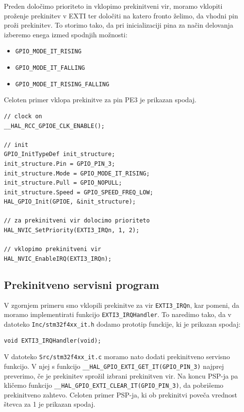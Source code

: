 \documentclass[12pt,letterpaper]{article}
\begin{document}
Preden določimo prioriteto in vklopimo prekinitveni vir, moramo vklopiti proženje prekinitev v EXTI ter določiti na katero fronto želimo, da vhodni pin proži prekinitev. To storimo tako, da pri inicializaciji pina za način delovanja izberemo enega izmed spodnjih možnosti:

\begin{itemize}
    \item \texttt{GPIO\_MODE\_IT\_RISING}
    \item \texttt{GPIO\_MODE\_IT\_FALLING}
    \item \texttt{GPIO\_MODE\_IT\_RISING\_FALLING}
\end{itemize}

Celoten primer vklopa prekinitve za pin PE3 je prikazan spodaj.

\begin{center}
\begin{lstlisting}[style=CStyle]
// clock on
__HAL_RCC_GPIOE_CLK_ENABLE();

// init
GPIO_InitTypeDef init_structure;
init_structure.Pin = GPIO_PIN_3;
init_structure.Mode = GPIO_MODE_IT_RISING;
init_structure.Pull = GPIO_NOPULL;
init_structure.Speed = GPIO_SPEED_FREQ_LOW;
HAL_GPIO_Init(GPIOE, &init_structure);

// za prekinitveni vir dolocimo prioriteto
HAL_NVIC_SetPriority(EXTI3_IRQn, 1, 2);

// vklopimo prekinitveni vir
HAL_NVIC_EnableIRQ(EXTI3_IRQn); 
\end{lstlisting}
\end{center}


\subsection*{Prekinitveno servisni program}

V zgornjem primeru smo vklopili prekinitve za vir \texttt{EXTI3\_IRQn}, kar pomeni, da moramo implementirati funkcijo \texttt{EXTI3\_IRQHandler}. To naredimo tako, da v datoteko \texttt{Inc/stm32f4xx\_it.h} dodamo prototip funckije, ki je prikazan spodaj:

\begin{center}
\begin{lstlisting}[style=CStyle]
void EXTI3_IRQHandler(void);
\end{lstlisting}
\end{center}

V datoteko \texttt{Src/stm32f4xx\_it.c} moramo nato dodati prekinitveno servisno funkcijo. V njej s funkcijo \texttt{\_\_HAL\_GPIO\_EXTI\_GET\_IT(GPIO\_PIN\_3)} najprej preverimo, če je prekinitev sprožil izbrani prekinitven vir. Na koncu PSP-ja pa kličemo funkcijo \texttt{\_\_HAL\_GPIO\_EXTI\_CLEAR\_IT(GPIO\_PIN\_3)}, da pobrišemo prekinitveno zahtevo. Celoten primer PSP-ja, ki ob prekinitvi poveča vrednost števca za 1 je prikazan spodaj.
\end{document}
